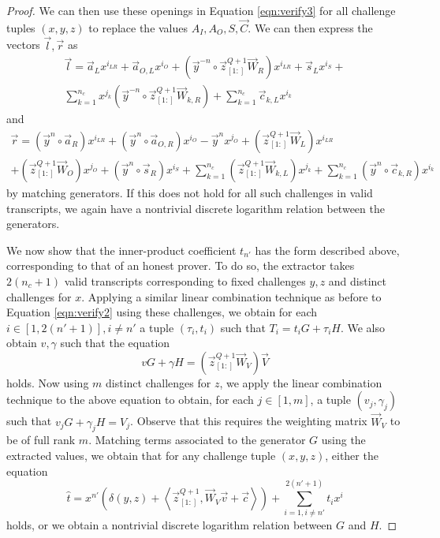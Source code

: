\documentclass{article}
\newcommand{\mat}[1]{\vec{#1}}
\newcommand{\zq}{\vec{z}^{Q+1}_{[1:]}}
\begin{document}
\begin{proof}
	We can then use these openings in Equation \ref{eqn:verify3} for all challenge tuples $(x, y, z)$ to replace the values $A_I, A_O, S, \vec{C}$.
	We can then express the vectors $\vec{l}, \vec{r}$ as
	\begin{multline*}
		\vec{l} = \vec{a}_L x^{i_{LR}} + \vec{a}_{O,L} x^{i_O} + \left( \vec{y}^{-n} \circ \zq \mat{W}_R \right) x^{i_{LR}} + \vec{s}_L x^{i_S} + \\
		\sum_{k=1}^{n_c} x^{j_k} \left( \vec{y}^{-n} \circ \zq \mat{W}_{k,R} \right) + \sum_{k=1}^{n_c} \vec{c}_{k,L} x^{i_k}
	\end{multline*}
	and
	\begin{multline*}
	\vec{r} = \left( \vec{y}^n \circ \vec{a}_R \right) x^{i_{LR}} + \left( \vec{y}^n \circ \vec{a}_{O,R} \right) x^{i_O} - \vec{y}^n x^{j_O} + \left( \zq \mat{W}_L \right) x^{i_{LR}} \\
	+ \left( \zq \mat{W}_O \right) x^{j_O} + \left( \vec{y}^n \circ \vec{s}_R \right) x^{i_S} + \sum_{k=1}^{n_c} \left( \zq \mat{W}_{k,L} \right) x^{j_k} + \sum_{k=1}^{n_c} \left( \vec{y}^n \circ \vec{c}_{k,R} \right) x^{i_k}
	\end{multline*}
	by matching generators.
	If this does not hold for all such challenges in valid transcripts, we again have a nontrivial discrete logarithm relation between the generators.

	We now show that the inner-product coefficient $t_{n'}$ has the form described above, corresponding to that of an honest prover.
	To do so, the extractor takes $2(n_c + 1)$ valid transcripts corresponding to fixed challenges $y, z$ and distinct challenges for $x$.
	Applying a similar linear combination technique as before to Equation \ref{eqn:verify2} using these challenges, we obtain for each $i \in [1, 2(n' + 1)], i \neq n'$ a tuple $(\tau_i, t_i)$ such that $T_i = t_i G + \tau_i H$.
	We also obtain $v, \gamma$ such that the equation
	$$v G + \gamma H = \left( \zq \mat{W}_V \right) \vec{V}$$
	holds.
	Now using $m$ distinct challenges for $z$, we apply the linear combination technique to the above equation to obtain, for each $j \in [1,m]$, a tuple $(v_j, \gamma_j)$ such that $v_j G + \gamma_j H = V_j$.
	Observe that this requires the weighting matrix $\mat{W}_V$ to be of full rank $m$.
	Matching terms associated to the generator $G$ using the extracted values, we obtain that for any challenge tuple $(x, y, z)$, either the equation
	$$\widehat{t} = x^{n'} \left( \delta(y, z) + \left\langle \zq, \mat{W}_V \vec{v} + \vec{c} \right\rangle \right) + \sum_{i=1, i \neq n'}^{2(n' + 1)} t_i x^i$$
	holds, or we obtain a nontrivial discrete logarithm relation between $G$ and $H$.


\end{proof}
\end{document}
